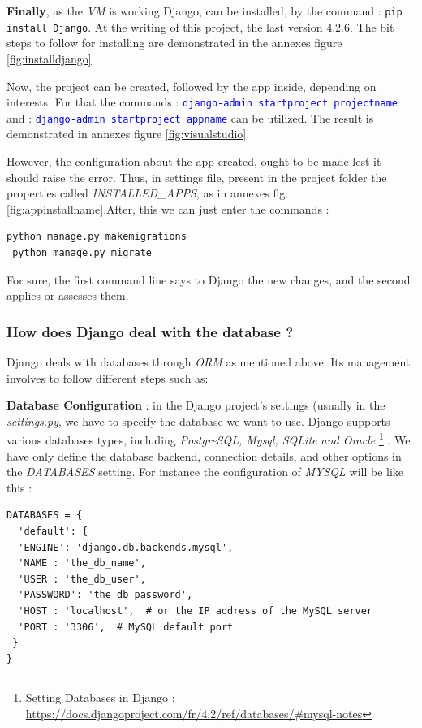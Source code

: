 \documentclass[12pt,a4paper, oneside]{book}
\begin{document}
   \textbf{Finally}, as the \textit{VM} is working Django, can be installed, by the command :  \texttt{pip install Django}. At the writing of this project, the last version 4.2.6. The bit steps to follow for installing are demonstrated in  the annexes figure \ref{fig:installdjango}

 Now, the project can be created, followed by the app inside, depending on interests. For that the commands  : \textcolor{blue}{ \texttt{django-admin startproject projectname}} and : \textcolor{blue}{\texttt{django-admin startproject appname}} can be utilized. The result is demonstrated in annexes figure \ref{fig:visualstudio}. 
 
  However, the configuration about the app created, ought to be made lest it should raise the error. Thus, in settings file, present in the project folder the properties called \textit{INSTALLED\_APPS}, as in annexes fig.\ref{fig:appinstallname}.\newline After, this we can just enter the commands : 
 \begin{lstlisting}[style=stylejupyter]
 python manage.py makemigrations
 python manage.py migrate
\end{lstlisting}
For sure, the first command line says to Django the new changes, and the second applies or assesses them. 


\subsubsection*{How does Django deal with the database ?} 
Django deals with databases through \textit{ORM} as mentioned above. Its management involves to follow different steps such as:

\textbf{Database Configuration } : in the Django project's settings (usually in the \textit{settings.py}, we have to specify the database we want to use. Django supports various databases types, including \textit{PostgreSQL, Mysql, SQLite and Oracle} \footnote{Setting Databases in Django : \url{https://docs.djangoproject.com/fr/4.2/ref/databases/\#mysql-notes}}  . We have only define the database backend, connection details, and other options in the \textit{DATABASES} setting. For instance the configuration of \textit{MYSQL} will be like this : 
\begin{lstlisting}[style=stylejupyter]
DATABASES = {
  'default': {
  'ENGINE': 'django.db.backends.mysql',
  'NAME': 'the_db_name',
  'USER': 'the_db_user',
  'PASSWORD': 'the_db_password',
  'HOST': 'localhost',  # or the IP address of the MySQL server
  'PORT': '3306',  # MySQL default port
 }
}
\end{lstlisting} 
\end{document}
